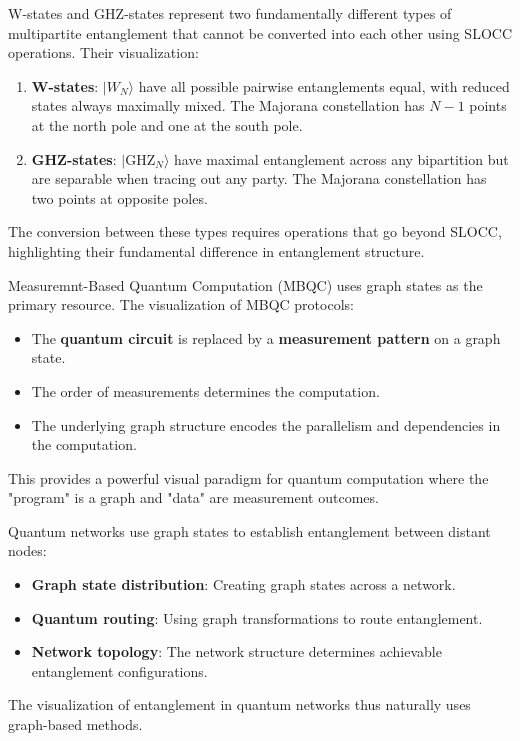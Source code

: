 \documentclass[12pt,a4paper]{article}
\begin{document}
W-states and GHZ-states represent two fundamentally different types of multipartite entanglement that cannot be converted into each other using SLOCC operations. Their visualization:

\begin{enumerate}
	\item \textbf{W-states}: $|W_N\rangle$ have all possible pairwise entanglements equal, with reduced states always maximally mixed. The Majorana constellation has $N-1$ points at the north pole and one at the south pole.

	\item \textbf{GHZ-states}: $|\text{GHZ}_N\rangle$ have maximal entanglement across any bipartition but are separable when tracing out any party. The Majorana constellation has two points at opposite poles.
\end{enumerate}

The conversion between these types requires operations that go beyond SLOCC, highlighting their fundamental difference in entanglement structure.

Measuremnt-Based Quantum Computation (MBQC) uses graph states as the primary resource. The visualization of MBQC protocols:
\begin{itemize}
	\item The \textbf{quantum circuit} is replaced by a \textbf{measurement pattern} on a graph state.
	\item The order of measurements determines the computation.
	\item The underlying graph structure encodes the parallelism and dependencies in the computation.
\end{itemize}

This provides a powerful visual paradigm for quantum computation where the "program" is a graph and "data" are measurement outcomes.

Quantum networks use graph states to establish entanglement between distant nodes:
\begin{itemize}
	\item \textbf{Graph state distribution}: Creating graph states across a network.
	\item \textbf{Quantum routing}: Using graph transformations to route entanglement.
	\item \textbf{Network topology}: The network structure determines achievable entanglement configurations.
\end{itemize}

The visualization of entanglement in quantum networks thus naturally uses graph-based methods.
\end{document}
